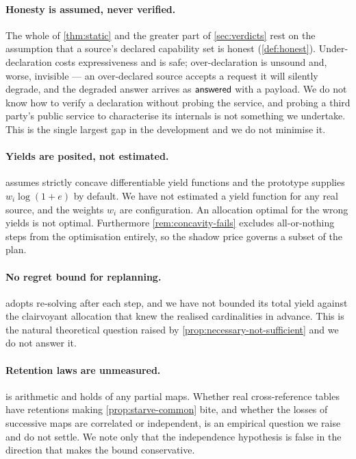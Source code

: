 \paragraph{Honesty is assumed, never verified.} The whole of \cref{thm:static}
and the greater part of \cref{sec:verdicts} rest on the assumption that a
source's declared capability set is honest (\cref{def:honest}). Under-declaration
costs expressiveness and is safe; over-declaration is unsound and, worse,
invisible --- an over-declared source accepts a request it will silently degrade,
and the degraded answer arrives as $\textsf{answered}$ with a payload. We do not know how to
verify a declaration without probing the service, and probing a third party's
public service to characterise its internals is not something we undertake.
This is the single largest gap in the development and we do not minimise it.

\paragraph{Yields are posited, not estimated.}  assumes
strictly concave differentiable yield functions and the prototype supplies
$w_i\log(1+e)$ by default. We have not estimated a yield function for any real
source, and the weights $w_i$ are configuration. An allocation optimal for the
wrong yields is not optimal. Furthermore \cref{rem:concavity-fails} excludes
all-or-nothing steps from the optimisation entirely, so the shadow price
governs a subset of the plan.

\paragraph{No regret bound for replanning.}  adopts
re-solving after each step, and we have not bounded its total yield against the
clairvoyant allocation that knew the realised cardinalities in advance. This is
the natural theoretical question raised by
\cref{prop:necessary-not-sufficient} and we do not answer it.

\paragraph{Retention laws are unmeasured.}  is arithmetic
and holds of any partial maps. Whether real cross-reference tables have
retentions making \cref{prop:starve-common} bite, and whether the losses of
successive maps are correlated or independent, is an empirical question we
raise and do not settle. We note only that the independence hypothesis is
false in the direction that makes the bound conservative.

